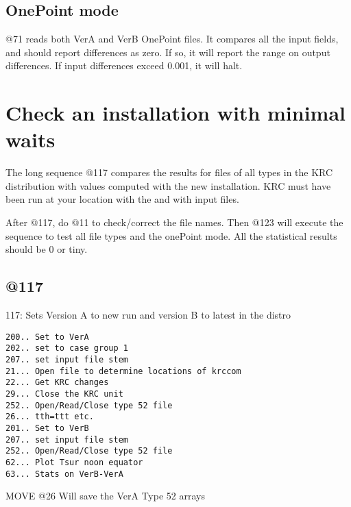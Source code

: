 \documentclass{article}  %
\begin{document}
\subsection{OnePoint mode}
 @71 reads both VerA and VerB OnePoint files. It compares all the input fields, and should report differences as zero. If so, it will report the range on output differences. If input differences exceed 0.001, it will halt.

\section{Check an installation with minimal waits}
The long sequence @117 compares the results for files of all types in the KRC distribution with values computed
with the new installation.  KRC must have been run at your location with the
 and with  input files.

After @117, do @11 to check/correct the file names.  Then @123 will execute the
 sequence to test all file types and the onePoint mode.  All the statistical
 results should be 0 or tiny.
\subsection{@117} %
117:  Sets Version A to new run and version B to latest in the distro
 
\vspace{-3.mm} 
\begin{verbatim}
200.. Set to VerA 
202.. set to case group 1
207.. set input file stem
21... Open file to determine locations of krccom
22... Get KRC changes
29... Close the KRC unit
252.. Open/Read/Close type 52 file
26... tth=ttt etc.
201.. Set to VerB
207.. set input file stem
252.. Open/Read/Close type 52 file
62... Plot Tsur noon equator
63... Stats on VerB-VerA
\end{verbatim}
  
 MOVE @26 Will save the VerA Type 52 arrays

\appendix
\end{document}

